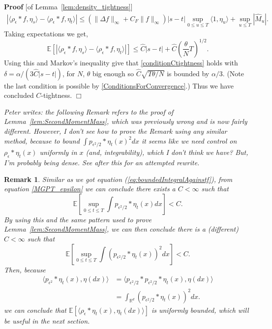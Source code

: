 \documentclass[12pt]{article}
\newenvironment {proof}{{\noindent\bf Proof }}{\hfill $\Box$ \medskip}
\newtheorem{remark}[theorem]{Remark}
\newcommand{\IE}{\mathbb E}
\newcommand{\IR}{\mathbb R}
\newcommand{\comment}[1]{{\color{blue} \it #1}}
\begin{document}
\begin{proof}[of Lemma~\ref{lem:density_tightness}]
    \begin{align*}
        \left|
        \langle \rho_{\epsilon} * f, \eta_s \rangle
        -
        \langle \rho_{\epsilon} * f, \eta_t \rangle
        \right|
        \leq
        ( \| \Delta f \|_\infty + C_F \|f\|_\infty) |s - t|
        \sup_{0 \leq u \leq T } \langle 1, \eta_u \rangle
        +
        \sup_{u \leq T} |\widehat{M}_u| .
    \end{align*}
    Taking expectations we get,
    \begin{equation}
        \IE\left[ \left|
            \langle \rho_\epsilon * f, \eta_s \rangle
            -
            \langle \rho_\epsilon * f, \eta_t \rangle
        \right| \right]
        \leq
        \widehat{C} |s-t|
        +
        \widehat{C} \left( \frac{\theta}{N} T \right)^{1/2} .
    \end{equation}
    Using this and Markov's inequality give that \eqref{conditionCtightness}
    holds with $\delta = \alpha/(3 \widehat{C}|s-t|)$,
    for $N$, $\theta$ big enough so $\widehat{C}\sqrt{T\theta/N}$ is bounded by $\alpha/3$.
    (Note the last condition is possible by \eqref{ConditionsForConvergence}.)
    Thus we have concluded $C$-tightness. 
\end{proof}

\comment{
    Peter writes: the following Remark refers to the proof of Lemma~\ref{lem:SecondMomentMass},
    which was previously wrong and is now fairly different.
    However, I don't see how to prove the Remark using any similar method,
    because to bound $\int p_{\epsilon^2 / 2} * \eta_t(x)^2 dx$
    it seems like we need control on $\rho_\epsilon * \eta_t(x)$ uniformly in $x$
    (and, integrability), which I don't think we have?
    But, I'm probably being dense.
    See after this for an attempted rewrite.
}

\begin{remark} \label{remark:BoundedIntegral}
    Similar as we got equation (\ref{eq:boundedIntegralAgainstf}), from equation \ref{MGPT_epsilon} we can conclude there exists a $C < \infty$ such that
    \[
        \IE\left[\sup_{0 \leq t \leq T} \int p_{\epsilon^2/2} * \eta_t(x) dx \right] < C .
    \]
    By using this and the same pattern used to prove Lemma~\ref{lem:SecondMomentMass},
    we can then conclude there is a (different) $C < \infty$ such that
    \[
        \IE\left[  \sup_{0 \leq t \leq T} \int \left( p_{\epsilon^2/2} * \eta_t(x) \right)^2 dx \right]
        <
        C .
    \]
    Then, because
    \begin{align*}
        \langle p_{\epsilon^2} * \eta_t(x), \eta(dx) \rangle
        &=
        \langle p_{\epsilon^2/2} * p_{\epsilon^2/2} * \eta_t(x), \eta(dx) \rangle
        \\ &=
        \int_{\IR^d} \left( p_{\epsilon^2/2} * \eta_t(x) \right)^2 dx .
    \end{align*}
    we can conclude that
    $\IE[\langle \rho_\epsilon*\eta_t(x), \eta_t(dx) \rangle ]$ is uniformly bounded,
    which will be useful in the next section.
\end{remark}
\end{document}

